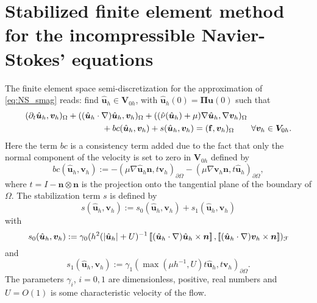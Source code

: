 \documentclass[10pt]{amsart}
\numberwithin{equation}{section}
\theoremstyle{definition}
\theoremstyle{remark}
\renewcommand{\(}{\bigl(}
\renewcommand{\)}{\bigr)}
\newcommand{\jump}[1]{\left[\hspace{-0.025in}\left[#1\right]\hspace{-0.025in}\right]}
\newcommand{\bld}[1]{\boldsymbol{#1}}
\newcommand{\bv}{\bld{v}}
\newcommand{\bn}{\bld{n}}
\newcommand{\bu}{\bld{u}}
\newcommand{\bhu}{\hat{\bld{u}}}
\newcommand{\bV}{\bld{V}}
\newcommand{\bPi}{\bld{\Pi}}
\begin{document}
\section{Stabilized finite element method for the incompressible Navier-Stokes' equations}
The finite element space semi-discretization
for the approximation of \eqref{eq:NS_smag} reads: find $
\bhu_h \in \bV_{0h}$, with $\bhu_h(0) = \bPi \bu(0)$ such that
\begin{align}\label{eq:FEM}
(\partial_t \bhu_h, \bv_h)_\Omega &+ ((\bhu_h \cdot \nabla) \bhu_h,
\bv_h)_\Omega + ((\hat \nu(\bhu_h)  + \mu) \nabla \bhu_h,\nabla
\bv_h)_\Omega 
\\ \nonumber
&\qquad \qquad 
+ bc(\bhu_h, \bv_h)+ s(\bhu_h,\bv_h)
= ({\bf f}, \bv_h)_\Omega \qquad 
 \forall  \bv_h \in \bV_{0h}.
\end{align}
Here the term $bc$ is a consistency term added due to the fact that
only the normal component of the velocity is set to zero in $\bV_{0h}
$ defined by
\[
bc(\bhu_h, \bv_h):= -(\mu \nabla \bhu_h \bn ,
t \bv_h )_{\partial \Omega}-(\mu \nabla \bv_h \bn ,
t \bhu_h )_{\partial \Omega},
\]
where $t = I - \bn \otimes \bn$ is the projection onto the tangential
plane of the boundary of $\Omega$. The stabilization term $s$ is defined by
\begin{equation*}
 s(\bhu_h,\bv_h):= s_0(\bhu_h,\bv_h) + s_1(\bhu_h,\bv_h)
\end{equation*}
with
\[
s_0(\bhu_h,\bv_h) := \gamma_0  ( h^{2} (|\bhu_h|+U)^{-1}
 \jump{(\bhu_h\cdot \nabla )\bhu_h\times \bn} ,
 \jump{(\bhu_h\cdot \nabla) \bv_h \times \bn})_{\mathcal{F}}  
\]
and
\[
s_1(\bhu_h,\bv_h):= \gamma_1 ( \max(\mu h^{-1},U) t \bhu_h ,
t \bv_h)_{\partial \Omega}.
\]
The
parameters $\gamma_i$, $i=0,1$ are dimensionless, positive, real numbers and $U = O(1)$
is some characteristic velocity of the flow. 
\end{document}
